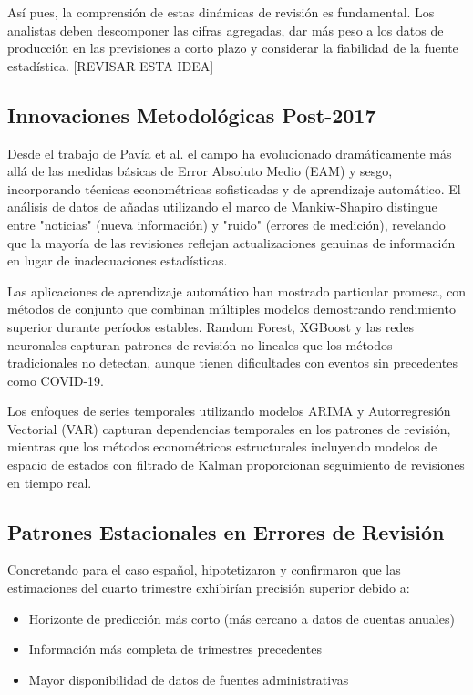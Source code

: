 \documentclass{article}
\begin{document}
Así pues, la comprensión de estas dinámicas de revisión es fundamental. Los analistas deben descomponer las cifras agregadas, dar más peso a los datos de producción en las previsiones a corto plazo y considerar la fiabilidad de la fuente estadística.
[REVISAR ESTA IDEA]

\subsection{Innovaciones Metodológicas Post-2017}

Desde el trabajo de Pavía et al. el campo ha evolucionado dramáticamente más allá de las medidas básicas de Error Absoluto Medio (EAM) y sesgo, incorporando técnicas econométricas sofisticadas y de aprendizaje automático. El análisis de datos de añadas utilizando el marco de Mankiw-Shapiro distingue entre "noticias" (nueva información) y "ruido" (errores de medición), revelando que la mayoría de las revisiones reflejan actualizaciones genuinas de información en lugar de inadecuaciones estadísticas.

Las aplicaciones de aprendizaje automático han mostrado particular promesa, con métodos de conjunto que combinan múltiples modelos demostrando rendimiento superior durante períodos estables. Random Forest, XGBoost y las redes neuronales capturan patrones de revisión no lineales que los métodos tradicionales no detectan, aunque tienen dificultades con eventos sin precedentes como COVID-19.

Los enfoques de series temporales utilizando modelos ARIMA y Autorregresión Vectorial (VAR) capturan dependencias temporales en los patrones de revisión, mientras que los métodos econométricos estructurales incluyendo modelos de espacio de estados con filtrado de Kalman proporcionan seguimiento de revisiones en tiempo real.

\subsection{Patrones Estacionales en Errores de Revisión}

Concretando para el caso español, \citet{pavia2017} hipotetizaron y confirmaron que las estimaciones del cuarto trimestre exhibirían precisión superior debido a:

\begin{itemize}
\item Horizonte de predicción más corto (más cercano a datos de cuentas anuales)
\item Información más completa de trimestres precedentes
\item Mayor disponibilidad de datos de fuentes administrativas
\end{itemize}
\end{document}
